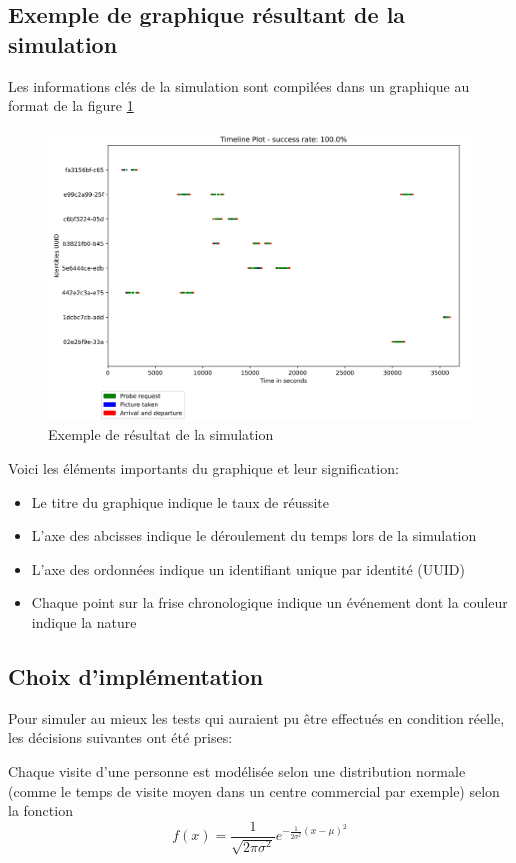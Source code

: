 \subsection{Exemple de graphique résultant de la simulation}
Les informations clés de la simulation sont compilées dans un graphique au format de la figure \ref{fig:simulation-result-example} 
\begin{figure}[H]
	\centering
	\includegraphics[width=12cm]{images/tests/exemple-graph.png}
	\caption{Exemple de résultat de la simulation}
	\label{fig:simulation-result-example}
\end{figure}

Voici les éléments importants du graphique et leur signification:
\begin{itemize}
    \item Le titre du graphique indique le taux de réussite
    \item L'axe des abcisses indique le déroulement du temps lors de la simulation
    \item L'axe des ordonnées indique un identifiant unique par identité (UUID)
    \item Chaque point sur la frise chronologique indique un événement dont la couleur indique la nature
\end{itemize}

\subsection{Choix d'implémentation}
Pour simuler au mieux les tests qui auraient pu être effectués en condition réelle, les décisions suivantes ont été prises:

Chaque visite d'une personne est modélisée selon une distribution normale (comme le temps de visite moyen dans un centre commercial par exemple) selon la fonction
\[f(x)=\frac{1}{\sqrt{2\pi \sigma^2}} e^{-\frac{1}{2\sigma^2}(x-\mu)^2}\]

